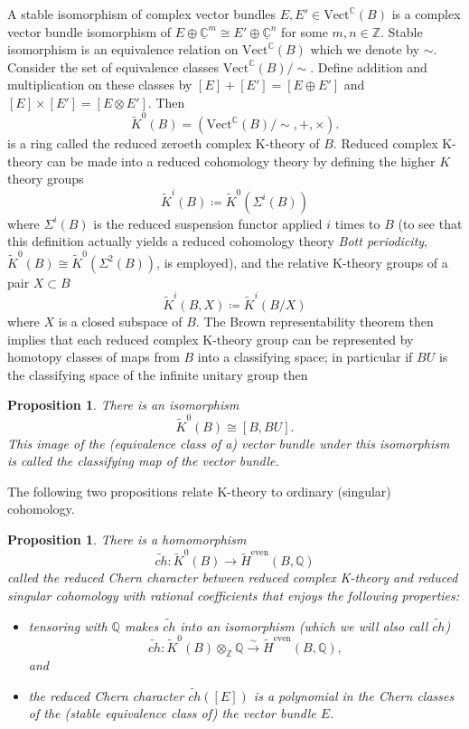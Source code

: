 \documentclass[11pt]{amsart}
\newtheorem{proposition}[theorem]{Proposition}
\theoremstyle{definition}
\theoremstyle{remark}
\def\C{\mathbb{C}}
\def\Q{\mathbb{Q}}
\def\Z{\mathbb{Z}}
\numberwithin{equation}{section}
\begin{document}
    A stable isomorphism of complex vector bundles $E,E'\in \textrm{Vect}^{\mathbb{C}}(B)$ is a complex vector bundle isomorphism of $E\oplus \underline{\C}^m\cong E'\oplus \underline{\C}^n$ for some $m,n\in \Z$. Stable isomorphism is an equivalence relation on $\textrm{Vect}^{\mathbb{C}}(B)$ which we denote by $\sim$. Consider the set of equivalence classes $\textrm{Vect}^{\mathbb{C}}(B)/\sim$. Define addition and multiplication on these classes by $[E]+[E']=[E\oplus E']$ and $[E]\times [E']=[E\otimes E']$. Then
    \begin{equation}
        \widetilde{K}^0(B)=(\textrm{Vect}^{\mathbb{C}}(B)/\sim,+,\times).
    \end{equation}
    is a ring called the reduced zeroeth complex K-theory of $B$. Reduced complex K-theory can be made into a reduced cohomology theory by defining the higher $K$ theory groups \[\widetilde{K}^i(B)\coloneq \widetilde{K}^0(\Sigma^i(B))\] where $\Sigma^i(B)$ is the reduced suspension functor applied $i$  times to $B$ (to see that this definition actually yields a reduced cohomology theory \emph{Bott periodicity}, $\widetilde{K}^0(B)\cong \widetilde{K}^0(\Sigma^2(B))$, is employed), and the relative K-theory groups of a pair $X\subset B$ \[\widetilde{K}^i(B,X)\coloneq \widetilde{K}^i(B/X)\] where $X$ is a closed subspace of $B$. The Brown representability theorem then implies that each reduced complex K-theory group can be represented by homotopy classes of maps from $B$ into a classifying space; in particular if $BU$ is the classifying space of the infinite unitary group then
\begin{proposition}There is an isomorphism \begin{equation}\widetilde{K}^0(B)\cong[B,BU].\end{equation}This image of the (equivalence class of a) vector bundle under this isomorphism is called the \emph{classifying map} of the vector bundle.\end{proposition}
The following two propositions relate K-theory to ordinary (singular) cohomology.
\begin{proposition}\cite[~Theorem 4.5]{HatcherVB}\label{cherncharacter}
    There is a homomorphism
    \begin{equation}
    \widetilde{ch}\colon \widetilde{K}^0(B) \to \widetilde{H}^{\textrm{even}}(B,\Q)
    \end{equation}
called the \emph{reduced Chern character} between reduced complex K-theory and reduced singular cohomology with rational coefficients that enjoys the 
following properties:
\begin{itemize}
\item tensoring with $\Q$ makes $\widetilde{ch}$ into an isomorphism (which we will also call $\widetilde{ch}$) \[\widetilde{ch}\colon \widetilde{K}^0(B)\otimes_{\Z} \Q\xrightarrow{\sim} \widetilde{H}^{\textrm{even}}(B,\Q),\] and
\item the reduced Chern character $\widetilde{ch}([E])$ is a polynomial in the Chern classes of the (stable equivalence class of) the vector bundle $E$.
\end{itemize}
\end{proposition}
\end{document}
